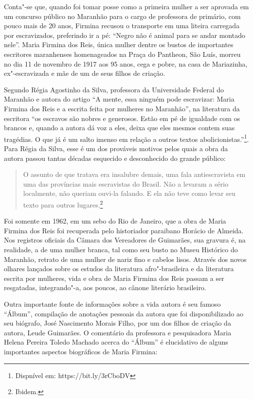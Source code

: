 Conta"-se que, quando foi tomar posse como a primeira mulher a ser
aprovada em um concurso público no Maranhão para o cargo de professora
de primário, com pouco mais de 20 anos, Firmina recusou o transporte em
uma liteira carregada por escravizados, preferindo ir a pé: ``Negro não
é animal para se andar montado nele''. Maria Firmina dos Reis, única
mulher dentre os bustos de importantes escritores maranhenses
homenageados na Praça do Pantheon, São Luís, morreu no dia 11 de
novembro de 1917 aos 95 anos, cega e pobre, na casa de Mariazinha,
ex"-escravizada e mãe de um de seus filhos de criação.


Segundo Régia Agostinho da Silva, professora da Universidade Federal do Maranhão e autora do artigo ``A mente, essa ninguém pode escravizar: Maria Firmina dos Reis e a escrita feita por mulheres no Maranhão'', na literatura da escritora ``os escravos são nobres e generosos. Estão em pé de igualdade com os brancos e, quando a autora dá voz a eles, deixa que eles mesmos contem suas tragédias. O que já é um salto imenso em relação a outros textos abolicionistas.''\footnote{Dispnível em: https://bit.ly/3rCboDV}. Para Régia da Silva, esse é um dos prováveis motivos pelos quais a obra da autora passou tantas décadas esquecido e desconhecido do grande público:

\begin{quote}
O assunto de que tratava era insalubre demais, uma fala antiescravista em uma das províncias mais escravistas do Brasil. Não a levaram a sério localmente, não queriam ouvi-la falando. E ela não teve como levar seu texto para outros lugares.\footnote{Ibidem.}
\end{quote}

Foi somente em 1962, em um sebo do Rio de Janeiro, que a obra de Maria
Firmina dos Reis foi recuperada pelo historiador paraibano Horácio de
Almeida. Nos registros oficiais da Câmara dos Vereadores de Guimarães,
sua gravura é, na realidade, a de uma mulher branca, tal como seu busto
no Museu Histórico do Maranhão, retrato de uma mulher de nariz fino e
cabelos lisos. Através dos novos olhares lançados sobre os estudos da
literatura afro"-brasileira e da literatura escrita por mulheres, vida e
obra de Maria Firmina dos Reis passam a ser resgatadas, integrando"-a,
aos poucos, ao cânone literário brasileiro.

Outra importante fonte de informações sobre a vida autora é seu famoso ``Álbum'', compilação de anotações pessoais da autora que foi disponibilizado ao seu biógrafo, José Nascimento Morais Filho, por um dos filhos de criação da autora, Leude Guimarães. O comentário da professora e pesquisadora Maria Helena Pereira Toledo Machado acerca do ``Álbum'' é elucidativo de alguns importantes aspectos biográficos de Maria Firmina:

